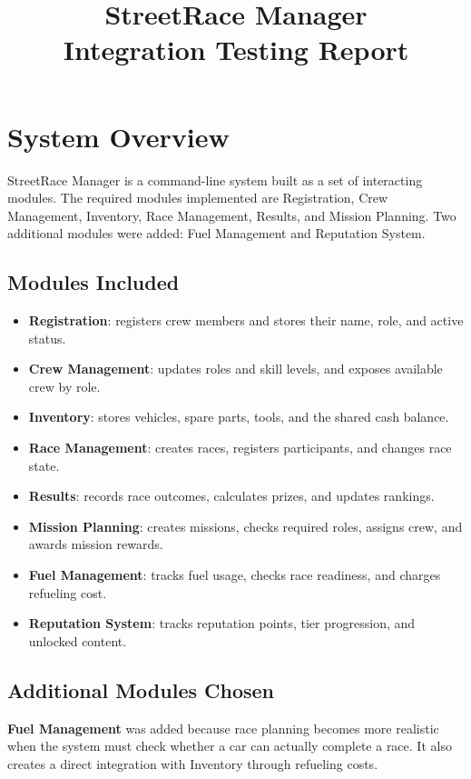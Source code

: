 \documentclass[12pt]{article}
\title{StreetRace Manager\\Integration Testing Report}
\author{}
\date{}
\begin{document}
\maketitle

\section{System Overview}
StreetRace Manager is a command-line system built as a set of interacting modules. The required modules implemented are Registration, Crew Management, Inventory, Race Management, Results, and Mission Planning. Two additional modules were added: Fuel Management and Reputation System.

\subsection{Modules Included}
\begin{itemize}
\item \textbf{Registration}: registers crew members and stores their name, role, and active status.
\item \textbf{Crew Management}: updates roles and skill levels, and exposes available crew by role.
\item \textbf{Inventory}: stores vehicles, spare parts, tools, and the shared cash balance.
\item \textbf{Race Management}: creates races, registers participants, and changes race state.
\item \textbf{Results}: records race outcomes, calculates prizes, and updates rankings.
\item \textbf{Mission Planning}: creates missions, checks required roles, assigns crew, and awards mission rewards.
\item \textbf{Fuel Management}: tracks fuel usage, checks race readiness, and charges refueling cost.
\item \textbf{Reputation System}: tracks reputation points, tier progression, and unlocked content.
\end{itemize}

\subsection{Additional Modules Chosen}
\textbf{Fuel Management} was added because race planning becomes more realistic when the system must check whether a car can actually complete a race. It also creates a direct integration with Inventory through refueling costs.
\end{document}
